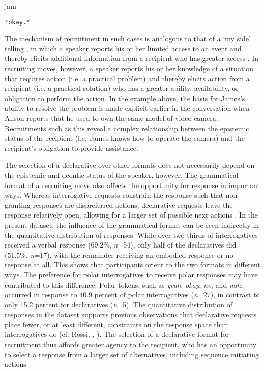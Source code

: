 \documentclass[output=paper,nonflat,modfont,draft]{langsci/langscibook}
\begin{document}
\begin{transbox}{23}{jam}
\begin{verbatim}
°okay.°
\end{verbatim}
\end{transbox}\bigskip

The mechanism of recruitment in such cases is analogous to that of a ‘my side’ telling \citep{pomerantz1980}, in which a speaker reports his or her limited access to an event and thereby elicits additional information from a recipient who has greater access \citep{Childs2012}. In recruiting moves, however, a speaker reports his or her knowledge of a situation that requires action (i.e. a practical problem) and thereby elicits action from a recipient (i.e. a practical solution) who has a greater ability, availability, or obligation to perform the action. In the example above, the basis for James’s ability to resolve the problem is made explicit earlier in the conversation when Alison reports that he used to own the same model of video camera. Recruitments such as this reveal a complex relationship between the epistemic status of the recipient (i.e. James knows how to operate the camera) and the recipient’s obligation to provide assistance.

The selection of a declarative over other formats does not necessarily depend on the epistemic and deontic status of the speaker, however. The grammatical format of a recruiting move also affects the opportunity for response in important ways. Whereas interrogative requests constrain the response such that non-granting responses are dispreferred actions, declarative requests leave the response relatively open, allowing for a larger set of possible next actions \citep{VinkhuyzenSzymanski2005,rossi_grammar_2016}. In the present dataset, the influence of the grammatical format can be seen indirectly in the quantitative distribution of responses. While over two thirds of interrogatives received a verbal response (69.2\%, \textit{n}=54), only half of the declaratives did (51.5\%, \textit{n}=17), with the remainder receiving an embodied response or no response at all. This shows that participants orient to the two formats in different ways. The preference for polar interrogatives to receive polar responses \citep{Raymond2003} may have contributed to this difference. Polar tokens, such as \textit{yeah}, \textit{okay}, \textit{no}, and \textit{nah}, occurred in response to 40.9 percent of polar interrogatives (\textit{n}=27), in contrast to only 15.2 percent for declaratives (\textit{n}=5). The quantitative distribution of responses in the dataset supports previous observations that declarative requests place fewer, or at least different, constraints on the response space than interrogatives do (cf. Rossi, , ). The selection of a declarative format for recruitment thus affords greater agency to the recipient, who has an opportunity to select a response from a larger set of alternatives, including sequence initiating actions \citep[cf.][111]{KendrickDrew2014}.
\end{document}
